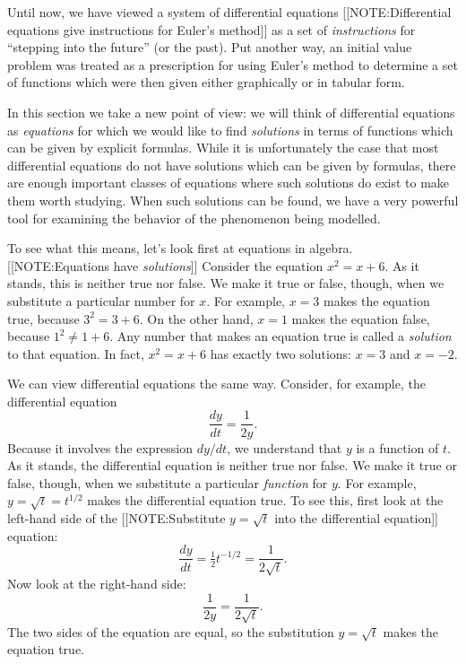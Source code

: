 Until now, we have viewed a system of differential equations
[[NOTE:Differential equations give instructions for Euler's method]]
as a set of {\em instructions\/} for ``stepping into the future'' (or
the past).  Put another way, an initial value problem was treated as a
prescription for using Euler's method to
determine a set of functions which were then given either graphically
or in tabular form.

In this section we take a new point of view: we will think of
differential equations as {\em equations\/} for which
we would like to find {\em solutions} in terms of
functions which can be given by explicit formulas.  While it is
unfortunately the case that most differential equations do not have
solutions which can be given by formulas, there are enough important
classes of equations where such solutions do exist to make them worth
studying.  When such solutions can be found, we have a very powerful
tool for examining the behavior of the phenomenon being modelled.

To see what this means, let's look first at equations in algebra.
[[NOTE:Equations have {\em solutions}]]
Consider the equation $x^2 = x + 6$.  As it stands, this is neither
true nor false.  We make it true or false, though, when we substitute
a particular number for $x$.  For example, $x = 3$ makes the equation
true, because $3^2 = 3 + 6$.  On the other hand, $x = 1$ makes the
equation false, because $1^2 \neq 1 + 6$.
Any number that makes an equation true is called a {\em solution\/} to
that equation.  In fact, $x^2 = x + 6$ has exactly two solutions: $x =
3$ and $x = -2$.

We can view differential equations the same way.  Consider, for
example, the differential equation
	\[
\dfrac{dy}{dt} = \dfrac{1}{2y}.
\]
Because it involves the expression $dy/dt$, we understand that $y$ is a function of $t$.  As it stands, the differential equation is neither true nor false.  We make it true or false, though, when we substitute a particular {\em function\/} for $y$.  For example, $y = \sqrt{t} = t^{1/2}$ makes the differential equation true.  To see this, first look at the left-hand side of the 
[[NOTE:Substitute $y = \sqrt{t}$  into the differential equation]]
equation:
	\[
\dfrac{dy}{dt} = \tfrac{1}{2} t^{-1/2} = 
		\dfrac{1}{2 \sqrt{t}}.
\]
Now look at the right-hand side:
	\[
\dfrac{1}{2y} = \dfrac{1}{2\sqrt{t}}.
\]
The two sides of the equation are equal, so the substitution $y = \sqrt{t}$ makes the equation true.

